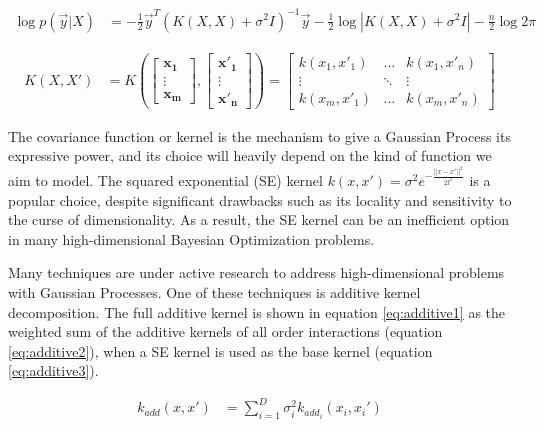 \documentclass{IOS-Book-Article}
\begin{document}
	\begin{equation} \label{eq:loglikelihood}
		\begin{aligned}
			\log{p(\vec{y}|X)} &= -\frac{1}{2}\vec{y}^T (K(X,X) + \sigma^2 I)^{-1}\vec{y} - \frac{1}{2}\log{|K(X,X) + \sigma^2 I|} - \frac{n}{2}\log{2\pi}
		\end{aligned}
	\end{equation}
	
	\begin{equation}
		\begin{aligned}
			K(X,X') &= K\left(\begin{bmatrix} \mathbf{x_1} \\ \vdots \\ \mathbf{x_m} \end{bmatrix}, \begin{bmatrix} \mathbf{x'_1} \\ \vdots \\ \mathbf{x'_n} \end{bmatrix}\right) = \begin{bmatrix} 
				k(x_1,x'_1) & \dots  & k(x_1,x'_n)\\
				\vdots & \ddots & \vdots\\
				k(x_m,x'_1) & \dots  & k(x_m,x'_n)
			\end{bmatrix}
		\end{aligned}
	\end{equation}
	
	The covariance function or kernel is the mechanism to give a Gaussian Process its expressive power, and its choice will heavily depend on the kind of function we aim to model\cite{kernel-composition}. The squared exponential (SE) kernel $k(x,x') = \sigma^2 e^{-\frac{||x-x'||^2}{2l^2}}$ is a popular choice, despite significant drawbacks such as its locality and sensitivity to the curse of dimensionality\cite{curse-dimensionality}. As a result, the SE kernel can be an inefficient option in many high-dimensional Bayesian Optimization problems.
	
	Many techniques are under active research to address high-dimensional problems with Gaussian Processes\cite{gp-high-dim}\cite{gp-high-dim2}. One of these techniques is additive kernel decomposition\cite{gp-additive}. The full additive kernel is shown in equation \ref{eq:additive1} as the weighted sum of the additive kernels of all order interactions (equation \ref{eq:additive2}), when a SE kernel is used as the base kernel (equation \ref{eq:additive3}).
	
	\begin{equation} \label{eq:additive1}
		\begin{aligned}
			k_{add}(x,x') &= \sum_{i=1}^D{\sigma_i^2 k_{add_i}(x_i,x_i')}
		\end{aligned}
	\end{equation}
	
\end{document}
